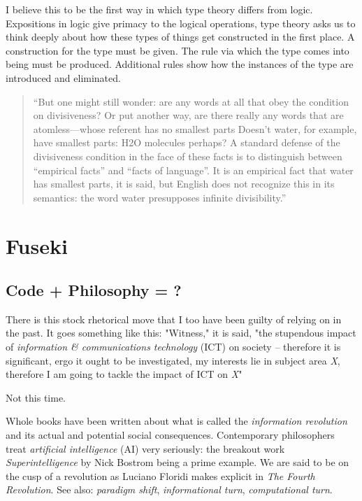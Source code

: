 \documentclass[dah,phd,a4paper]{xe_uccthesis}
\newcommand{\work}[1] {\textit{#1}}
\begin{document}
I believe this to be the first way in which type theory differs from logic. Expositions in logic give primacy to the logical operations, type theory asks us to think deeply about how these types of things get constructed in the first place. A construction for the type must be given. The rule via which the type comes into being must be produced. Additional rules show how the instances of the type are introduced and eliminated.

\begin{quotation}
“But one might still wonder: are any words at all that obey the condition on divisiveness? Or put another way, are there really any words that are atomless—whose referent has no smallest parts Doesn’t water, for example, have smallest parts: H2O molecules perhaps? A standard defense of the divisiveness condition in the face of these facts is to distinguish between “empirical facts” and “facts of language”. It is an empirical fact that water has smallest parts, it is said, but English does not recognize this in its semantics: the word water presupposes infinite divisibility.”
\begin{flushright}
\citep[p. 129]{pelletier_kinds_2009}
\end{flushright}
\end{quotation}

\part*{Fuseki}

\chapter{Code + Philosophy = ?}

There is this stock rhetorical move that I too have been guilty of relying on in the past. It goes something like this: "Witness," it is said, "the stupendous impact of \textit{information \& communications technology} (ICT) on society -- therefore it is significant, ergo it ought to be investigated, my interests lie in subject area \textit{X}, therefore I am going to tackle the impact of ICT on \textit{X}"

Not this time.

Whole books have been written about what is called the \textit{information revolution} and its actual and potential social consequences. Contemporary philosophers treat   \textit{artificial intelligence} (AI) very seriously: the breakout work \work{Superintelligence} \citep{bostrom_superintelligence:_2016} by Nick Bostrom being a prime example. We are said to be on the cusp of a revolution as Luciano Floridi makes explicit in \work{The Fourth Revolution}\citep{floridi_fourth_2016}. See also: \emph{paradigm shift}, \emph{informational turn}, \emph{computational turn}.
\end{document}
